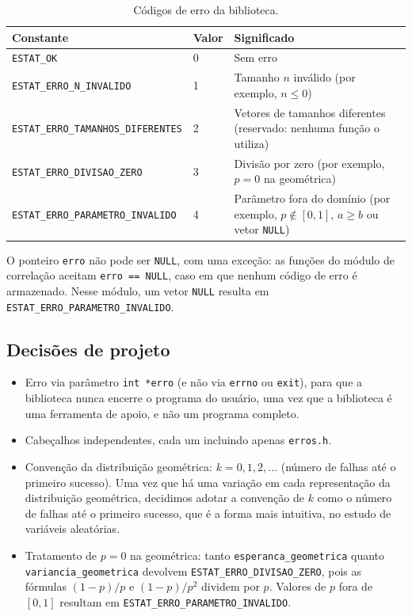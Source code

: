 \documentclass[12pt,a4paper]{article}
\newcommand{\cod}[1]{\texttt{#1}}
\begin{document}
\begin{table}[h]
\centering
\begin{tabular}{@{}llp{7cm}@{}}
\toprule
Constante & Valor & Significado \\
\midrule
\cod{ESTAT\_OK} & 0 & Sem erro \\
\cod{ESTAT\_ERRO\_N\_INVALIDO} & 1 & Tamanho $n$ inválido (por exemplo, $n \le 0$) \\
\cod{ESTAT\_ERRO\_TAMANHOS\_DIFERENTES} & 2 & Vetores de tamanhos diferentes (reservado: nenhuma função o utiliza) \\
\cod{ESTAT\_ERRO\_DIVISAO\_ZERO} & 3 & Divisão por zero (por exemplo, $p = 0$ na geométrica) \\
\cod{ESTAT\_ERRO\_PARAMETRO\_INVALIDO} & 4 & Parâmetro fora do domínio (por exemplo, $p \notin [0,1]$, $a \ge b$ ou vetor \cod{NULL}) \\
\bottomrule
\end{tabular}
\caption{Códigos de erro da biblioteca.}
\end{table}


O ponteiro \cod{erro} não pode ser \cod{NULL}, com uma exceção: as funções do módulo de correlação aceitam \cod{erro == NULL}, caso em que nenhum código de erro é armazenado. 
Nesse módulo, um vetor \cod{NULL} resulta em \cod{ESTAT\_ERRO\_PARAMETRO\_INVALIDO}.

\subsection{Decisões de projeto}
\begin{itemize}[leftmargin=*]
  \item Erro via parâmetro \cod{int *erro} (e não via \cod{errno} ou \cod{exit}),
        para que a biblioteca nunca encerre o programa do usuário, uma vez que a biblioteca é uma ferramenta de apoio, e não um programa completo.

  \item Cabeçalhos independentes, cada um incluindo apenas \cod{erros.h}.
  \item Convenção da distribuição geométrica: $k = 0, 1, 2, \ldots$ (número de falhas até o primeiro sucesso).
  Uma vez que há uma variação em cada representação da distribuição geométrica, decidimos adotar a convenção de $k$ como o número de falhas até o primeiro sucesso, que é a forma mais intuitiva, no estudo de variáveis aleatórias.
 
  \item Tratamento de $p = 0$ na geométrica: tanto \cod{esperanca\_geometrica} quanto \cod{variancia\_geometrica} devolvem \cod{ESTAT\_ERRO\_DIVISAO\_ZERO}, pois as fórmulas $(1-p)/p$ e $(1-p)/p^{2}$ dividem por $p$. Valores de $p$ fora de $[0,1]$ resultam em \cod{ESTAT\_ERRO\_PARAMETRO\_INVALIDO}.
\end{itemize}
\end{document}
